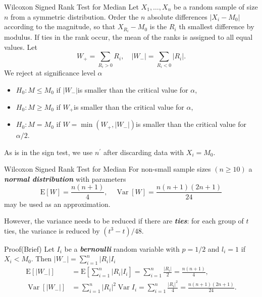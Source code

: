 \documentclass{beamer}
\newcommand{\bb}[1]{\textcolor{antiquefuchsia}{\textbf{\textit{#1}}}}
\begin{document}
\begin{frame}{Wilcoxon Signed Rank Test for Median}
Let $X_{1}, \ldots, X_{n}$ be a random sample of size $n$ from a symmetric distribution. Order the $n$ absolute differences $\left|X_{i}-M_{0}\right|$ according to the magnitude, so that $X_{R_{i}}-M_{0}$ is the $R_{i}$ th smallest difference by modulus. If ties in the rank occur, the mean of the ranks is assigned to all equal values. Let
$$
W_{+}=\sum_{R_{i}>0} R_{i}, \quad\left|W_{-}\right|=\sum_{R_{i}<0}\left|R_{i}\right| .
$$
We reject at significance level $\alpha$
\begin{itemize}
\item $H_{0}: M \leq M_{0}$ if $\left|W_{-}\right|$is smaller than the critical value for $\alpha$,
\item $H_{0}: M \geq M_{0}$ if $W_{+}$is smaller than the critical value for $\alpha$,
\item $H_{0}: M=M_{0}$ if $W=\min \left(W_{+},\left|W_{-}\right|\right)$is smaller than the critical value for $\alpha / 2$.
\end{itemize}
As is in the sign test, we use $n^{\prime}$ after discarding data with $X_{i}=M_{0}$.
\end{frame}

\begin{frame}{Wilcoxon Signed Rank Test for Median}
For non-small sample sizes $(n \geq 10)$ a \bb{normal distribution} with parameters
$$
\mathrm{E}[W]=\frac{n(n+1)}{4}, \quad \operatorname{Var}[W]=\frac{n(n+1)(2 n+1)}{24}
$$
may be used as an approximation.

However, the variance needs to be reduced if there are \bb{ties}: for each group of $t$ ties, the variance is reduced by $\left(t^{3}-t\right) / 48$.
\begin{block}{Proof(Brief)}
Let $I_{i}$ be a \bb{bernoulli} random variable with  $p=1 / 2$ and $l_{i}=1$ if $X_{i}<M_{0}$. Then $\left|W_{-}\right|=\sum_{i=1}^{n}\left|R_{i}\right| I_{i}$
$$
\begin{aligned}
\mathrm{E}\left[\left|W_{-}\right|\right] &=\mathrm{E}\left[\sum_{i=1}^{n}\left|R_{i}\right| I_{i}\right] =\sum_{i=1}^{n} \frac{\left|R_{i}\right|}{2}=\frac{n(n+1)}{4}, \\
\operatorname{Var}[\left|W_{-}\right|] &=\sum_{i=1}^{n}\left|R_{i}\right|^{2} \operatorname{Var} I_{i} =\sum_{i=1}^{n} \frac{\left|R_{i}\right|^{2}}{4}=\frac{n(n+1)(2 n+1)}{24} .
\end{aligned}
$$
\end{block}
\end{frame}
\end{document}
